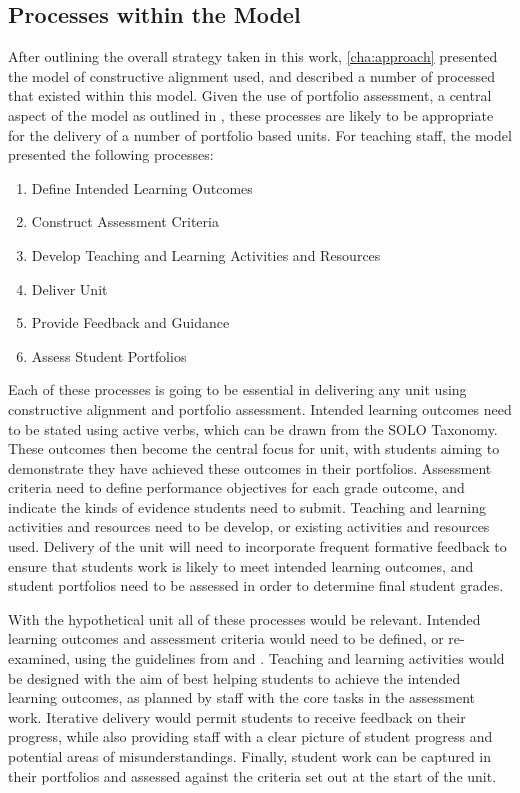 
\subsection{Processes within the Model} %
\label{sub:processes_within_the_model}

After outlining the overall strategy taken in this work, \cref{cha:approach} presented the model of constructive alignment used, and described a number of processed that existed within this model. Given the use of portfolio assessment, a central aspect of the model as outlined in , these processes are likely to be appropriate for the delivery of a number of portfolio based units. For teaching staff, the model presented the following processes:

\begin{enumerate}
	\item Define Intended Learning Outcomes
	\item Construct Assessment Criteria
	\item Develop Teaching and Learning Activities and Resources
	\item Deliver Unit
	\item Provide Feedback and Guidance
	\item Assess Student Portfolios
\end{enumerate}

Each of these processes is going to be essential in delivering any unit using constructive alignment and portfolio assessment. Intended learning outcomes need to be stated using active verbs, which can be drawn from the SOLO Taxonomy. These outcomes then become the central focus for unit, with students aiming to demonstrate they have achieved these outcomes in their portfolios. Assessment criteria need to define performance objectives for each grade outcome, and indicate the kinds of evidence students need to submit. Teaching and learning activities and resources need to be develop, or existing activities and resources used. Delivery of the unit will need to incorporate frequent formative feedback to ensure that students work is likely to meet intended learning outcomes, and student portfolios need to be assessed in order to determine final student grades. 

With the hypothetical unit all of these processes would be relevant. Intended learning outcomes and assessment criteria would need to be defined, or re-examined, using the guidelines from  and . Teaching and learning activities would be designed with the aim of best helping students to achieve the intended learning outcomes, as planned by staff with the core tasks in the assessment work. Iterative delivery would permit students to receive feedback on their progress, while also providing staff with a clear picture of student progress and potential areas of misunderstandings. Finally, student work can be captured in their portfolios and assessed against the criteria set out at the start of the unit.

